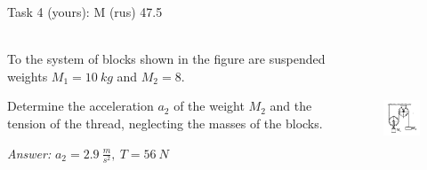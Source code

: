 \documentclass[aspectratio=169]{beamer}
\newcommand{\fbckg}[1]{\usebackgroundtemplate{\texttt{[image: \#1]}}}%
\begin{document}
\begin{frame}[t]{Task 4 (yours): M (rus) 47.5}
    \framesubtitle{}
        \begin{columns}[T,onlytextwidth]
            \begin{column}{0.59\textwidth}
                To the system of blocks shown in the figure are suspended weights $M_1=10\ kg$ and $M_2=8$.
                \medskip
                
                Determine the acceleration $a_2$ of the weight $M_2$ and the tension of the thread, neglecting the masses of the blocks.
                \bigskip

                \textit{Answer:} $a_2 = 2.9\ \frac{m}{s^2},\ T=56\ N$
            \end{column}
            \begin{column}{0.39\textwidth}
                \begin{figure}[H]
                    \centering\includegraphics[height=4cm,width=1\textwidth,keepaspectratio]{image22.png}
                    \label{fig:image22.png}
                \end{figure}
            \end{column}
        \end{columns}
    \end{frame}

\fbckg{fibeamer/figs/last_page.png}
\frame[plain]{}
\end{document}
